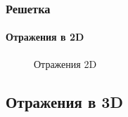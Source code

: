 \begin{frame}
    \frametitle{Решетка}
    \framesubtitle{Отражения в 2D}
    \begin{figure}
        \begin{center}
            \caption{Отражения 2D}\label{pict:flip}
        \end{center}
    \end{figure} 
\end{frame}


\subsection{Отражения в 3D}


